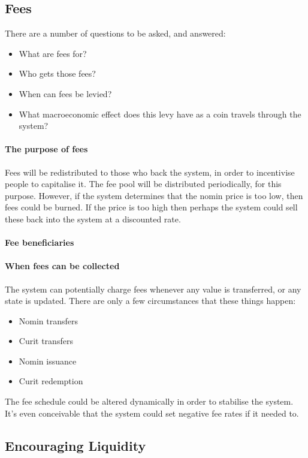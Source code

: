 \documentclass{article}
\begin{document}
\subsection{Fees}
There are a number of questions to be asked, and answered:
\begin{itemize}
    \item What are fees for?
    \item Who gets those fees?
    \item When can fees be levied?
    \item What macroeconomic effect does this levy have as a coin travels through the system?
\end{itemize}

\paragraph{The purpose of fees}
Fees will be redistributed to those who back the system, in order to incentivise people to capitalise it.
The fee pool will be distributed periodically, for this purpose.
However, if the system determines that the nomin price is too low, then fees could be burned. If the price is
too high then perhaps the system could sell these back into the system at a discounted rate.

\paragraph{Fee beneficiaries}

\paragraph{When fees can be collected}
The system can potentially charge fees whenever any value is transferred, or any state is updated.
There are only a few circumstances that these things happen:
\begin{itemize}
    \item Nomin transfers
    \item Curit transfers
    \item Nomin issuance
    \item Curit redemption
\end{itemize}
The fee schedule could be altered dynamically in order to stabilise the system. It's even conceivable
that the system could set negative fee rates if it needed to.

\subsection{Encouraging Liquidity}
\end{document}

